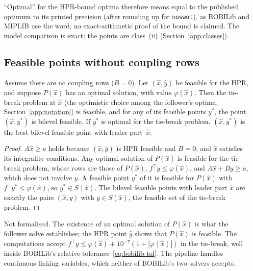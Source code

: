 ``Optimal'' for the HPR-bound optima therefore means equal to the published optimum to
its printed precision (after rounding up for \texttt{noswot}), as BOBILib and
MIPLIB use the word; no exact-arithmetic proof of the bound is claimed. The
model comparison is exact; the points are class~(ii) (Section~\ref{app:classes}).

\subsection{Feasible points without coupling rows}

\begin{proposition}\label{prop:general-pipeline}
Assume there are no coupling rows ($B=0$). Let $(\hat x,\hat y)$ be feasible for
the HPR, and suppose $P(\hat x)$ has an optimal solution, with value
$\varphi(\hat x)$. Then the tie-break problem at $\hat x$ (the optimistic choice
among the follower's optima, Section~\ref{app:notation}) is feasible, and for
any of its feasible points $y^{*}$, the point $(\hat x,y^{*})$ is bilevel
feasible. If $y^{*}$ is optimal for the tie-break problem, $(\hat x,y^{*})$ is the
best bilevel feasible point with leader part~$\hat x$.
\end{proposition}
\begin{proof}
$A\hat x\ge a$ holds because $(\hat x,\hat y)$ is HPR feasible and $B=0$, and
$\hat x$ satisfies its integrality conditions. Any optimal solution of
$P(\hat x)$ is feasible for the tie-break problem, whose rows are those of
$P(\hat x)$, $f^{\top}y\le\varphi(\hat x)$, and $A\hat x+By\ge a$, which does not involve
$y$. A feasible point $y^{*}$ of it is feasible for $P(\hat x)$ with
$f^{\top}y^{*}\le\varphi(\hat x)$, so $y^{*}\in S(\hat x)$. The bilevel feasible points
with leader part $\hat x$ are exactly the pairs $(\hat x,y)$ with $y\in S(\hat x)$, the
feasible set of the tie-break problem.
\end{proof}
\noindent Not formalised. The existence of an optimal solution of $P(\hat x)$
is what the follower solve establishes; the HPR point $\hat y$ shows that
$P(\hat x)$ is feasible. The computations accept $f^{\top}y\le\varphi(\hat x)+10^{-7}(1+|\varphi(\hat x)|)$
in the tie-break, well inside BOBILib's relative tolerance~\eqref{eq:bobilib-tol}.
The pipeline handles continuous linking variables, which neither of
BOBILib's two solvers accepts.

